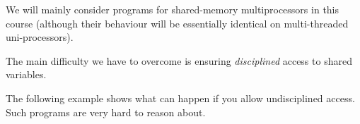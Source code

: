\documentclass[notes,color]{sepslide0}
\begin{document}










\begin{slide}

We will mainly consider programs for shared-memory multiprocessors in this
course (although their behaviour will be essentially identical on
multi-threaded uni-processors).

The main difficulty we have to overcome is ensuring \emph{disciplined} access
to shared variables.  

The following example shows what can happen if you allow undisciplined access.
Such programs are very hard to reason about.
\end{slide}
\end{document}
